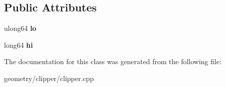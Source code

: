 \subsection*{Public Attributes}
\begin{DoxyCompactItemize}
\item 
\mbox{\label{class_clipper_lib_1_1_int128_a991b9da6e53c777a94fca640e505b258}} 
ulong64 {\bfseries lo}
\item 
\mbox{\label{class_clipper_lib_1_1_int128_a167643d0860a14fb563e055511e15e14}} 
long64 {\bfseries hi}
\end{DoxyCompactItemize}


The documentation for this class was generated from the following file\+:\begin{DoxyCompactItemize}
\item 
geometry/clipper/clipper.\+cpp\end{DoxyCompactItemize}
